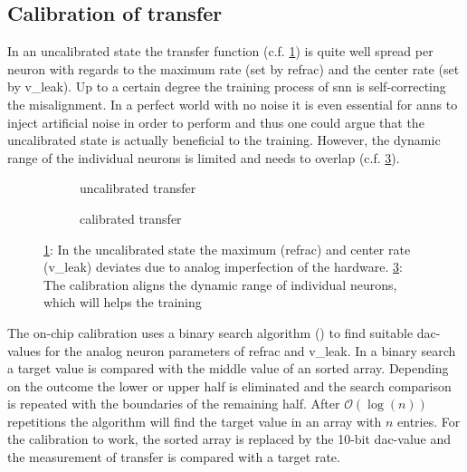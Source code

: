 \subsection{Calibration of \gls{transfer}}\label{calibration}
In an uncalibrated state the transfer function (c.f. \cref{transferfunction_wout_calib}) is quite well spread per neuron with regards to the maximum rate (set by \gls{refrac}) and the center rate (set by \gls{v_leak}). Up to a certain degree the training process of \gls{snn} is self-correcting the misalignment. In a perfect world with no noise it is even essential for \glspl{ann} to inject artificial noise in order to perform and thus one could argue that the uncalibrated state is actually beneficial to the training. However, the dynamic range of the individual neurons is limited and needs to overlap (c.f. \cref{transferfunction_w_calib}).

\begin{figure}
	\captionsetup[subfigure]{justification=centering}
	\centering
	\begin{subfigure}[b]{0.47\textwidth}
		
			\caption{uncalibrated \gls{transfer}}
		\label{transferfunction_wout_calib}
	\end{subfigure}
	\begin{subfigure}[b]{0.47\textwidth}		
			
		\caption{calibrated \gls{transfer}}
		\label{transferfunction_w_calib}
	\end{subfigure}
	\caption{\cref{transferfunction_wout_calib}: In the uncalibrated state the maximum (\gls{refrac}) and center rate (\gls{v_leak}) deviates due to analog imperfection of the hardware. \cref{transferfunction_w_calib}: The calibration aligns the dynamic range of individual neurons, which will helps the training}
\end{figure}

The on-chip calibration uses a binary search algorithm (\cite{binarysearchsource}) to find suitable \gls{dac}-values for the analog neuron parameters of \gls{refrac} and \gls{v_leak}. In a binary search a target value is compared with the middle value of an sorted array. Depending on the outcome the lower or upper half is eliminated and the search comparison is repeated with the boundaries of the remaining half. After $\mathcal{O}(\log(n))$ repetitions the algorithm will find the target value in an array with $n$ entries. For the calibration to work, the sorted array is replaced by the 10-bit \gls{dac}-value and the measurement of \gls{transfer} is compared with a target rate.

